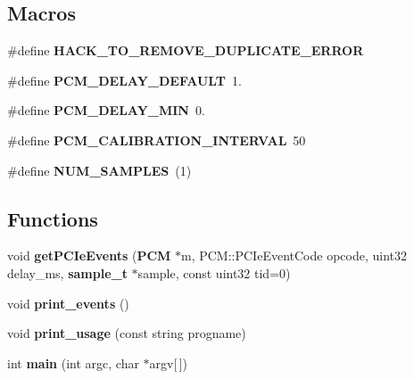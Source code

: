 \subsection*{Macros}
\begin{DoxyCompactItemize}
\item 
\#define {\bfseries H\+A\+C\+K\+\_\+\+T\+O\+\_\+\+R\+E\+M\+O\+V\+E\+\_\+\+D\+U\+P\+L\+I\+C\+A\+T\+E\+\_\+\+E\+R\+R\+OR}\label{pcm-pcie_8cpp_ac4eeb11d89b0f517835a12a04443ebe4}

\item 
\#define {\bfseries P\+C\+M\+\_\+\+D\+E\+L\+A\+Y\+\_\+\+D\+E\+F\+A\+U\+LT}~1.\label{pcm-pcie_8cpp_aa9ecc55c90c7a69729babc4f5f91ed96}

\item 
\#define {\bfseries P\+C\+M\+\_\+\+D\+E\+L\+A\+Y\+\_\+\+M\+IN}~0.\label{pcm-pcie_8cpp_acccbe8441d6dd75bdc949f5f0ee126c5}

\item 
\#define {\bfseries P\+C\+M\+\_\+\+C\+A\+L\+I\+B\+R\+A\+T\+I\+O\+N\+\_\+\+I\+N\+T\+E\+R\+V\+AL}~50\label{pcm-pcie_8cpp_a433dde946b6713059756318598c9a6fe}

\item 
\#define {\bfseries N\+U\+M\+\_\+\+S\+A\+M\+P\+L\+ES}~(1)\label{pcm-pcie_8cpp_af0b23eedf2352de4c1eff77e1401730c}

\end{DoxyCompactItemize}
\subsection*{Functions}
\begin{DoxyCompactItemize}
\item 
void {\bfseries get\+P\+C\+Ie\+Events} ({\bf P\+CM} $\ast$m, P\+C\+M\+::\+P\+C\+Ie\+Event\+Code opcode, uint32 delay\+\_\+ms, {\bf sample\+\_\+t} $\ast$sample, const uint32 tid=0)\label{pcm-pcie_8cpp_aa8c99791d2e27465fefdb7c2f8bbabd1}

\item 
void {\bfseries print\+\_\+events} ()\label{pcm-pcie_8cpp_a3193d1a8ca2451055cda0dc7cb39b71d}

\item 
void {\bfseries print\+\_\+usage} (const string progname)\label{pcm-pcie_8cpp_a4e43544978d9afb2faf08dce11cab70c}

\item 
int {\bfseries main} (int argc, char $\ast$argv[$\,$])\label{pcm-pcie_8cpp_a0ddf1224851353fc92bfbff6f499fa97}

\end{DoxyCompactItemize}
